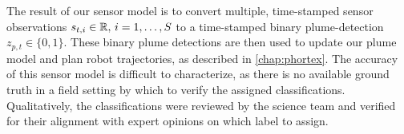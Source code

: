 The result of our sensor model is to convert multiple, time-stamped sensor observations $s_{t, i} \in \mathbb{R}, \, i = 1, \dots, S$ to a time-stamped binary plume-detection $z_{p, t} \in \{0, 1\}$. These binary plume detections are then used to update our plume model and plan robot trajectories, as described in \cref{chap:phortex}. The accuracy of this sensor model is difficult to characterize, as there is no available ground truth in a field setting by which to verify the assigned classifications. Qualitatively, the classifications were reviewed by the science team and verified for their alignment with expert opinions on which label to assign.


